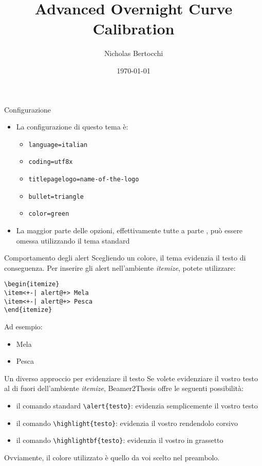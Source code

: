 \documentclass[xcolor=dvipsnames]{beamer}
\author{Nicholas Bertocchi}
\title{Advanced Overnight Curve Calibration}
\date{\today}
\begin{document}


\begin{frame}[t,fragile]{Configurazione}
\begin{itemize}
\item La configurazione di questo tema è:
\begin{itemize}
\item \verb!language=italian!
\item \verb!coding=utf8x!
\item \verb!titlepagelogo=name-of-the-logo!
\item \verb!bullet=triangle!
\item \verb!color=green!
\end{itemize}
\item La maggior parte delle opzioni, effettivamente tutte a parte , può essere omessa utilizzando il tema standard
\end{itemize}
\end{frame}

\begin{frame}[fragile]{Comportamento degli alert}
Scegliendo un colore, il tema evidenzia il testo di conseguenza. Per inserire gli alert nell'ambiente \emph{itemize}, potete utilizzare:
\begin{verbatim}
\begin{itemize}
\item<+-| alert@+> Mela
\item<+-| alert@+> Pesca
\end{itemize}
\end{verbatim}
Ad esempio:
\begin{itemize}
\item<+-| alert@+> Mela
\item<+-| alert@+> Pesca
\end{itemize}
\end{frame}

\begin{frame}[fragile]{Un diverso approccio per evidenziare il testo}
Se volete evidenziare il vostro testo al di fuori dell'ambiente \emph{itemize}, Beamer2Thesis offre le seguenti possibilità:
\begin{itemize}
\item il comando standard \verb!\alert{testo}!: evidenzia semplicemente il vostro \alert{testo}
\item il comando \verb!\highlight{testo}!: evidenzia il vostro  rendendolo corsivo
\item il comando \verb!\highlightbf{testo}!: evidenzia il vostro  in grassetto
\end{itemize}
Ovviamente, il colore utilizzato è quello da voi scelto nel preambolo.
\end{frame}
\end{document}
